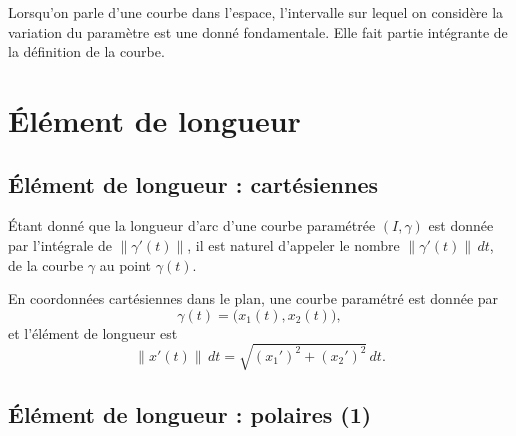 \begin{remark}
    Lorsqu'on parle d'une courbe dans l'espace, l'intervalle sur lequel on considère la variation du paramètre est une donné fondamentale. Elle fait partie intégrante de la définition de la courbe.
\end{remark}


\section{Élément de longueur}

\subsection{Élément de longueur : cartésiennes}

Étant donné que la longueur d'arc d'une courbe paramétrée $(I,\gamma)$ est donnée par l'intégrale de $\| \gamma'(t) \|$, il est naturel d'appeler le nombre $\| \gamma'(t) \|\,dt$,  de la courbe $\gamma$ au point $\gamma(t)$.

En coordonnées cartésiennes dans le plan, une courbe paramétré est donnée par 
\begin{equation}
    \gamma(t)=\big( x_1(t),x_2(t) \big),
\end{equation}
et l'élément de longueur est
\begin{equation}        \label{EqElLongCart}
    \| x'(t) \|\, dt =\sqrt{(x_1')^2+(x_2')^2} \, dt.
\end{equation}

\subsection{Élément de longueur : polaires (1)}

